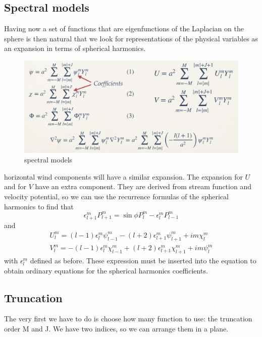 \subsection{Spectral models}
Having now a set of functions that are eigenfunctions of the Laplacian on the sphere is then natural that we look for representations of the physical variables as an expansion in terms of spherical harmonics.

\begin{figure}[h!]
	\centering
	\includegraphics[width=0.5\linewidth]{uploads/Screenshot 2024-11-17 203102.png}
	\caption{spectral models}
	\label{fig:enter-label}
\end{figure}
horizontal wind components will have a similar expansion. The expansion for $U$ and for $V$ have an extra component. They are derived from stream function and velocity potential, so we can use the recurrence formulas of the spherical harmonics to find that
$$\epsilon_{l+1}^mP_{l+1}^m=\sin\phi P^m_l-\epsilon_l^mP^m_{l-1}$$
and
\begin{align*}
	U_l^m=(l-1)\epsilon_l^m\psi^m_{l-1}-(l+2)\epsilon_{l+1}^m\psi_{l+1}^m+im\chi_l^m \\
	V_l^m=-(l-1)\epsilon_l^m\chi_{l-1}^m+(l+2)\epsilon_{l+1}^m\chi_{l+1}^m+im\psi_l^m
\end{align*}
with $\epsilon_l^m$ defined as before.
These expression must be inserted into the equation to obtain ordinary equations for the spherical harmonics coefficients.
\subsection{Truncation}
The very first we have to do is choose how many function to
use: the truncation order M and J. We have two indices, so
we can arrange them in a plane.


